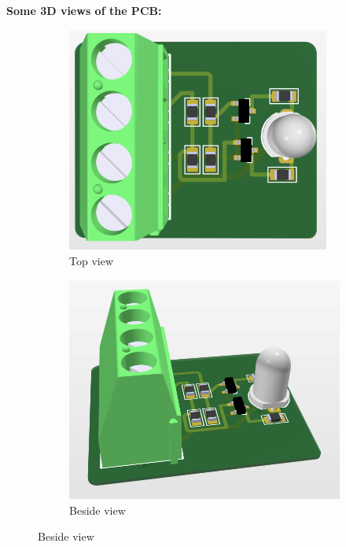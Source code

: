 \textbf{Some 3D views of the PCB:}
\begin{figure}[h!]
    \centering
    \begin{subfigure}{0.495\textwidth}
        \centering
        \includegraphics[width=0.95\textwidth]{graphics/ex2/f4.png}
        \caption*{Top view}
    \end{subfigure}
    \hfill
    \begin{subfigure}{0.495\textwidth}
        \centering
        \includegraphics[width=\textwidth]{graphics/ex2/f5.png}
        \caption*{Beside view}
    \end{subfigure}
\end{figure}

